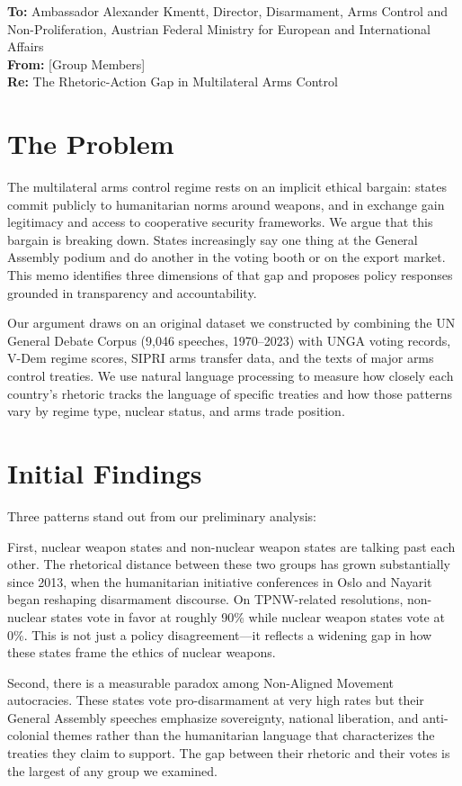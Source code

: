 \documentclass[12pt]{article}
\begin{document}
\noindent \textbf{To:} Ambassador Alexander Kmentt, Director, Disarmament, Arms Control and Non-Proliferation, Austrian Federal Ministry for European and International Affairs \\
\textbf{From:} [Group Members] \\
\textbf{Re:} The Rhetoric-Action Gap in Multilateral Arms Control

\section*{The Problem}

The multilateral arms control regime rests on an implicit ethical bargain: states commit publicly to humanitarian norms around weapons, and in exchange gain legitimacy and access to cooperative security frameworks. We argue that this bargain is breaking down. States increasingly say one thing at the General Assembly podium and do another in the voting booth or on the export market. This memo identifies three dimensions of that gap and proposes policy responses grounded in transparency and accountability.

Our argument draws on an original dataset we constructed by combining the UN General Debate Corpus (9,046 speeches, 1970--2023) with UNGA voting records, V-Dem regime scores, SIPRI arms transfer data, and the texts of major arms control treaties. We use natural language processing to measure how closely each country's rhetoric tracks the language of specific treaties and how those patterns vary by regime type, nuclear status, and arms trade position.

\section*{Initial Findings}

Three patterns stand out from our preliminary analysis:

First, nuclear weapon states and non-nuclear weapon states are talking past each other. The rhetorical distance between these two groups has grown substantially since 2013, when the humanitarian initiative conferences in Oslo and Nayarit began reshaping disarmament discourse. On TPNW-related resolutions, non-nuclear states vote in favor at roughly 90\% while nuclear weapon states vote at 0\%. This is not just a policy disagreement---it reflects a widening gap in how these states frame the ethics of nuclear weapons.

Second, there is a measurable paradox among Non-Aligned Movement autocracies. These states vote pro-disarmament at very high rates but their General Assembly speeches emphasize sovereignty, national liberation, and anti-colonial themes rather than the humanitarian language that characterizes the treaties they claim to support. The gap between their rhetoric and their votes is the largest of any group we examined.
\end{document}
